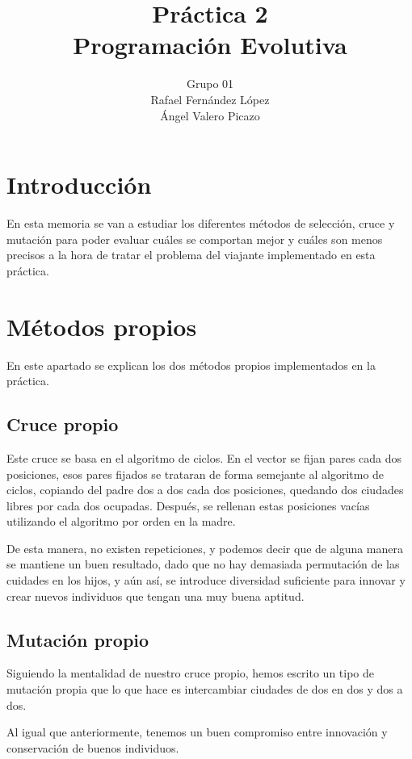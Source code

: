 \documentclass[12pt]{article}
\title{Práctica 2\\Programación Evolutiva}
\author{Grupo 01\\Rafael Fernández López\\Ángel Valero Picazo}
\date{}
\begin{document}
\maketitle
\newpage
\newpage
\tableofcontents
\newpage

\section{Introducción}

	En esta memoria se van a estudiar los diferentes métodos de selección, cruce y mutación para poder
    evaluar cuáles se comportan mejor y cuáles son menos precisos a la hora de tratar el problema del
    viajante implementado en esta práctica.

\section{Métodos propios}

	En este apartado se explican los dos métodos propios implementados en la práctica.

\subsection{Cruce propio}

	Este cruce se basa en el algoritmo de ciclos. En el vector se fijan pares cada dos posiciones,
    esos pares fijados se trataran de forma semejante al algoritmo de ciclos, copiando del padre dos
    a dos cada dos posiciones, quedando dos ciudades libres por cada dos ocupadas. Después, se rellenan
    estas posiciones vacías utilizando el algoritmo por orden en la madre.

    De esta manera, no existen repeticiones, y podemos decir que de alguna manera se mantiene un buen resultado, dado que no hay
    demasiada permutación de las cuidades en los hijos, y aún así, se introduce diversidad suficiente
    para innovar y crear nuevos individuos que tengan una muy buena aptitud.

\subsection{Mutación propio}

    Siguiendo la mentalidad de nuestro cruce propio, hemos escrito un tipo de mutación propia que lo
    que hace es intercambiar ciudades de dos en dos y dos a dos.

    Al igual que anteriormente, tenemos un buen compromiso entre innovación y conservación de buenos
    individuos.
    
\end{document}
